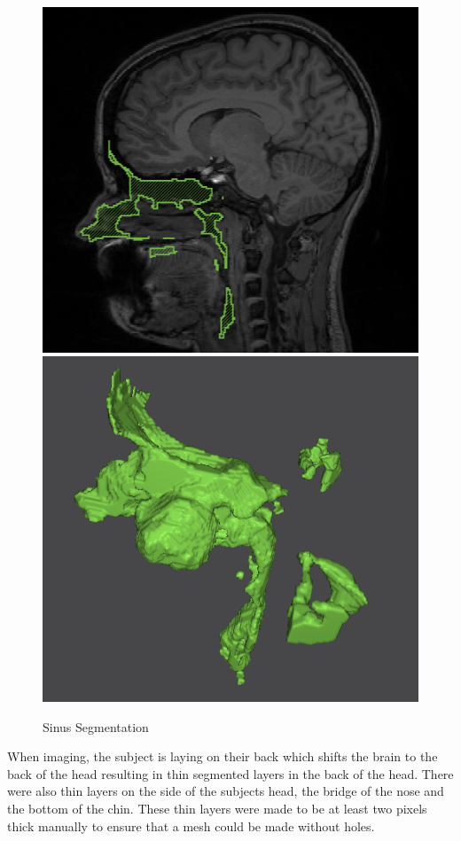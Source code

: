 \begin{figure}[H]
\begin{center}
\includegraphics[width=.49\textwidth]{Figures/sinus_sag}
\includegraphics[width=.49\textwidth]{Figures/sinus_iso}
\caption{Sinus Segmentation}
\label{fig:sinus}
\end{center}
\end{figure}

When imaging, the subject is laying on their back which shifts the brain to the back of the head resulting in thin segmented layers in the back of the head. There were also thin layers on the side of the subjects head, the bridge of the nose and the bottom of the chin. These thin layers were made to be at least two pixels thick manually to ensure that a mesh could be made without holes. 


